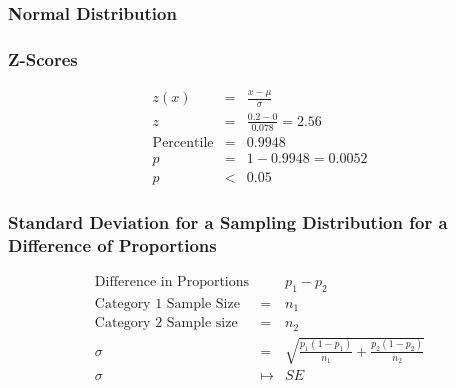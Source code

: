 \documentclass{beamer}
\begin{document}
\begin{frame}
  \frametitle{Normal Distribution}
  \centering
\end{frame}

\begin{frame}
  \frametitle{Z-Scores}
  \begin{displaymath}
    \begin{array}{rcl}
      z(x) & = & \frac{x - \mu}{\sigma} \\[2em]
      z & = & \frac{0.2 - 0}{0.078} = 2.56\\[2em]
      \text{Percentile} & = & 0.9948 \\[2em]
      p & = & 1 - 0.9948 = 0.0052 \\[2em]
      p & < & 0.05
    \end{array}
  \end{displaymath} 
\end{frame}

\begin{frame}
  \frametitle{Standard Deviation for a Sampling Distribution for a Difference of Proportions} 
  \begin{displaymath}
    \begin{array}{rcl}
      \text{Difference in Proportions} & & p_1 - p_2 \\[2em]
      \text{Category 1 Sample Size} & = & n_1 \\[2em]
      \text{Category 2 Sample size} & = & n_2 \\[2em]
      \sigma & = & \sqrt{\frac{p_1(1-p_1)}{n_1} +
      \frac{p_2(1-p_2)}{n_2}}\\[2em]
      \sigma & \mapsto & SE 
    \end{array}
  \end{displaymath} 
\end{frame}
\end{document}
